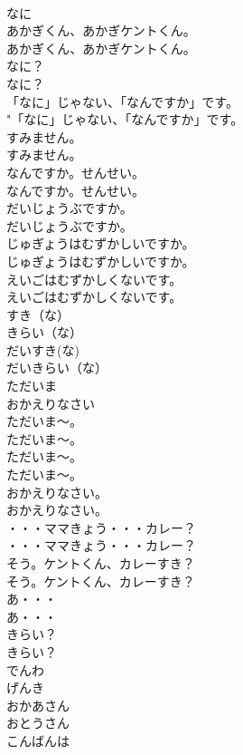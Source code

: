 \documentclass[8pt]{extreport}
\begin{document}
\begin{CJK}{UTF8}{min}
\\	なに
\\	あかぎくん、あかぎケントくん。	
\\	あかぎくん、あかぎケントくん。 
\\	なに？	
\\	なに？ 
\\	「なに」じゃない、「なんですか」です。	
\\	"「なに」じゃない、「なんですか」です。 
\\	すみません。	
\\	すみません。 
\\	なんですか。せんせい。	
\\	なんですか。せんせい。 
\\	だいじょうぶですか。	
\\	だいじょうぶですか。 
\\	じゅぎょうはむずかしいですか。	
\\	じゅぎょうはむずかしいですか。 
\\	えいごはむずかしくないです。	
\\	えいごはむずかしくないです。 
\\	すき（な）
\\	きらい（な）
\\	だいすき(な)
\\	だいきらい（な）
\\	ただいま
\\	おかえりなさい
\\	ただいま～。	
\\	ただいま～。 
\\	ただいま～。	
\\	ただいま～。 
\\	おかえりなさい。	
\\	おかえりなさい。 
\\	・・・ママきょう・・・カレー？	
\\	・・・ママきょう・・・カレー？ 
\\	そう。ケントくん、カレーすき？	
\\	そう。ケントくん、カレーすき？ 
\\	あ・・・	
\\	あ・・・ 
\\	きらい？	
\\	きらい？ 
\\	でんわ
\\	げんき
\\	おかあさん
\\	おとうさん
\\	こんばんは

\end{CJK}
\end{document}

